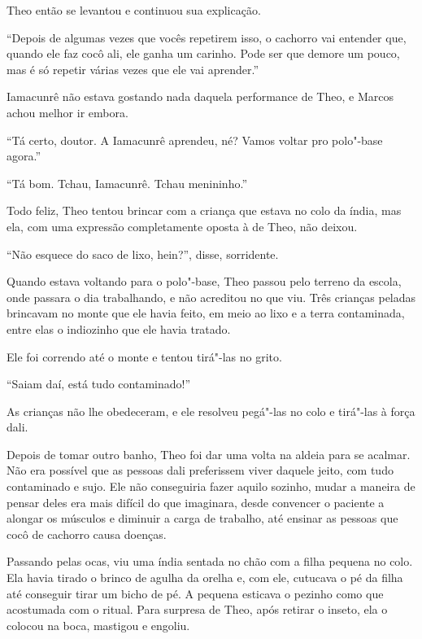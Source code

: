 Theo então se levantou e continuou sua explicação.

``Depois de algumas vezes que vocês repetirem isso, o cachorro vai
entender que, quando ele faz cocô ali, ele ganha um carinho. Pode ser
que demore um pouco, mas é só repetir várias vezes que ele vai
aprender.''

Iamacunrê não estava gostando nada daquela performance de Theo, e Marcos
achou melhor ir embora.

``Tá certo, doutor. A Iamacunrê aprendeu, né? Vamos voltar pro polo"-base
agora.''

``Tá bom. Tchau, Iamacunrê. Tchau menininho.''

Todo feliz, Theo tentou brincar com a criança que estava no colo da
índia, mas ela, com uma expressão completamente oposta à de Theo, não
deixou.

``Não esquece do saco de lixo, hein?'', disse, sorridente.

Quando estava voltando para o polo"-base, Theo passou pelo terreno da
escola, onde passara o dia trabalhando, e não acreditou no que viu. Três
crianças peladas brincavam no monte que ele havia feito, em meio ao lixo
e a terra contaminada, entre elas o indiozinho que ele havia tratado.

Ele foi correndo até o monte e tentou tirá"-las no grito.

``Saiam daí, está tudo contaminado!''

As crianças não lhe obedeceram, e ele resolveu pegá"-las no colo e
tirá"-las à força dali.

\asterisc


Depois de tomar outro banho, Theo foi dar uma volta na aldeia para se
acalmar. Não era possível que as pessoas dali preferissem viver daquele
jeito, com tudo contaminado e sujo. Ele não conseguiria fazer aquilo
sozinho, mudar a maneira de pensar deles era mais difícil do que imaginara,
desde convencer o paciente a alongar os músculos e diminuir a carga de
trabalho, até ensinar as pessoas que cocô de cachorro causa doenças.

Passando pelas ocas, viu uma índia sentada no chão com a filha pequena
no colo. Ela havia tirado o brinco de agulha da orelha e, com ele,
cutucava o pé da filha até conseguir tirar um bicho de pé. A pequena
esticava o pezinho como que acostumada com o ritual. Para surpresa de
Theo, após retirar o inseto, ela o colocou na boca, mastigou e engoliu.

